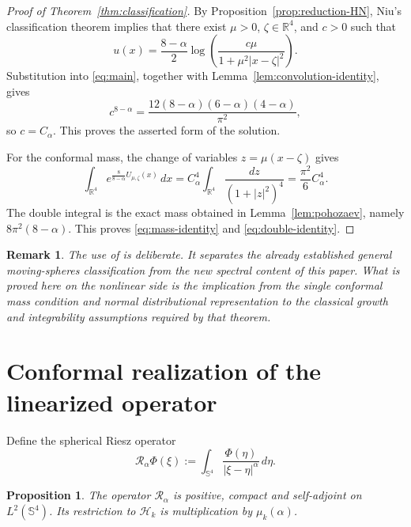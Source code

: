 \documentclass[11pt]{article}
\newtheorem{proposition}[theorem]{Proposition}
\newtheorem{remark}[theorem]{Remark}
\numberwithin{equation}{section}
\begin{document}
\begin{proof}[Proof of Theorem~\ref{thm:classification}]
By Proposition~\ref{prop:reduction-HN}, Niu's classification theorem \cite{NiuClassification} implies that there exist \(\mu>0\), \(\zeta\in\mathbb R^{4}\), and \(c>0\) such that
\[
u(x)=\frac{8-\alpha}{2}\log
\left(\frac{c\mu}{1+\mu^{2}|x-\zeta|^{2}}\right).
\]
Substitution into \eqref{eq:main}, together with Lemma~\ref{lem:convolution-identity}, gives
\[
c^{8-\alpha}
=\frac{12(8-\alpha)(6-\alpha)(4-\alpha)}{\pi^{2}},
\]
so \(c=C_{\alpha}\). This proves the asserted form of the solution.

For the conformal mass, the change of variables \(z=\mu(x-\zeta)\) gives
\[
\int_{\mathbb R^{4}}
e^{\frac{8}{8-\alpha}U_{\mu,\zeta}(x)}\,dx
=C_{\alpha}^{4}
\int_{\mathbb R^{4}}\frac{dz}{(1+|z|^{2})^{4}}
=\frac{\pi^{2}}{6}C_{\alpha}^{4}.
\]
The double integral is the exact mass obtained in Lemma~\ref{lem:pohozaev}, namely \(8\pi^{2}(8-\alpha)\). This proves \eqref{eq:mass-identity} and \eqref{eq:double-identity}.
\end{proof}

\begin{remark}
The use of \cite{HuangNiu,NiuClassification} is deliberate. It separates the already established general moving-spheres classification from the new spectral content of this paper. What is proved here on the nonlinear side is the implication from the single conformal mass condition and normal distributional representation to the classical growth and integrability assumptions required by that theorem.
\end{remark}

\section{Conformal realization of the linearized operator}

Define the spherical Riesz operator
\begin{equation*}
\mathcal R_{\alpha}\Phi(\xi)
:=\int_{\mathbb S^{4}}
\frac{\Phi(\eta)}{|\xi-\eta|^{\alpha}}\,d\eta.
\end{equation*}

\begin{proposition}\label{prop:Riesz-operator}
The operator \(\mathcal R_{\alpha}\) is positive, compact and self-adjoint on \(L^{2}(\mathbb S^{4})\). Its restriction to \(\mathcal H_{k}\) is multiplication by \(\mu_{k}(\alpha)\).
\end{proposition}
\end{document}
